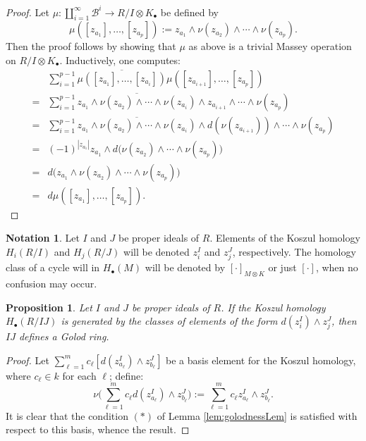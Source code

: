 \documentclass[10pt]{amsart}
\newtheorem{prop}[theorem]{Proposition}
\theoremstyle{definition}
\newtheorem{notation}[theorem]{Notation}
\theoremstyle{remark}
\newtheorem{the context}[theorem]{The Context}
\numberwithin{equation}{theorem}
\numberwithin{equation}{section}
\newcommand{\cat}[1]{\mathcal{#1}}
\def\w{\wedge}
\begin{document}
\begin{proof}
Let $\mu : \coprod_{i=1}^\infty \cat{B}^i \to R/I \otimes K_\bullet$ be defined by
$$\mu ([z_{a_1}] , \dots , [z_{a_p}] ) := z_{a_1} \w \nu (z_{a_2}) \w \cdots \w \nu (z_{a_p}).$$
Then the proof follows by showing that $\mu$ as above is a trivial Massey operation on $R/I \otimes K_\bullet$. Inductively, one computes:
\begingroup\allowdisplaybreaks
\begin{align*}
    &\sum_{i=1}^{p-1} \overline{\mu ([z_{a_1}] , \dots , [z_{a_i}])} \mu ([z_{a_{i+1}}] , \dots , [z_{a_p}]) \\
    =& \sum_{i=1}^{p-1} \overline{z_{a_1} \w \nu (z_{a_2}) \w \cdots \w \nu (z_{a_i})} \w z_{a_{i+1}} \w \cdots \w \nu (z_{a_p}) \\
    =& \sum_{i=1}^{p-1} \overline{z_{a_1} \w \nu (z_{a_2}) \w \cdots \w \nu (z_{a_i})} \w d ( \nu (z_{a_{i+1}})) \w \cdots \w \nu (z_{a_p}) \\
    =& (-1)^{|z_{a_1}|} z_{a_1} \w d \big( \nu (z_{a_2}) \w \cdots \w \nu (z_{a_p}) \big) \\
    =& d \big( z_{a_1} \w \nu (z_{a_2}) \w \cdots \w \nu (z_{a_p}) \big) \\
    =& d \mu ( [z_{a_1}] , \dots , [z_{a_p}]).
\end{align*}
\endgroup
\end{proof}



\begin{notation}
Let $I$ and $J$ be proper ideals of $R$. Elements of the Koszul homology $H_i (R/I)$ and $H_j (R/J)$ will be denoted $z_i^I$ and $z_j^J$, respectively. The homology class of a cycle will in $H_\bullet (M)$ will be denoted by $[ \cdot]_{M \otimes K}$ or just $[ \cdot]$, when no confusion may occur.
\end{notation}

\begin{prop}\label{prop:prodKoszul}
Let $I$ and $J$ be proper ideals of $R$. If the Koszul homology $H_\bullet (R / IJ)$ is generated by the classes of elements of the form $d(z_i^I) \w z_j^J$, then $IJ$ defines a Golod ring.
\end{prop}

\begin{proof}
Let $\sum_{\ell=1}^m c_\ell [d(z_{a_\ell}^I) \w z_{b_\ell}^J]$ be a basis element for the Koszul homology, where $c_\ell \in k$ for each $\ell$; define:
$$\nu \Big( \sum_{\ell=1}^m c_\ell d(z_{a_\ell}^I) \w z_{b_\ell}^J \Big) := \sum_{\ell=1}^m c_\ell z_{a_\ell}^I \w z_{b_\ell}^J.$$
It is clear that the condition $(*)$ of Lemma \ref{lem:golodnessLem} is satisfied with respect to this basis, whence the result.
\end{proof}
\end{document}

